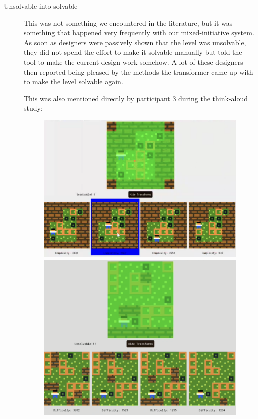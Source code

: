 \begin{description}
\item[Unsolvable into solvable] This was not something we encountered in the literature, but it was something that happened very frequently with our mixed-initiative system. As soon as designers were passively shown that the level was unsolvable, they did not spend the effort to make it solvable manually but told the tool to make the current design work somehow. A lot of these designers then reported being pleased by the methods the transformer came up with to make the level solvable again.

This was also mentioned directly by participant 3 during the think-aloud study: \textit{}

\begin{figure}[!htbp]
\begin{minipage}{0.5\textwidth}
\centering
\includegraphics[width=\textwidth]{figures/unsolvablepart4.png}
\end{minipage}  \hfill
\begin{minipage}{0.5\textwidth}
\centering
\includegraphics[width=\textwidth]{figures/unsolvablepart72.png}

\end{minipage}
\end{figure}
\end{description}
